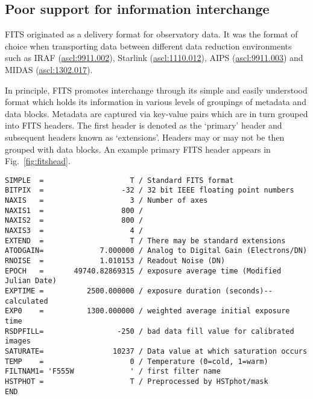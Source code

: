 \documentclass[final,authoryear,5p,times,twocolumn]{elsarticle}
\begin{document}
{{\subsection{Poor support for information interchange}
\label{section_poor_exchange}

FITS originated as a delivery format for observatory data. It was the format
of choice when transporting data between different data reduction
environments such as IRAF (\href{http://ascl.net/9911.002}{ascl:9911.002}),
Starlink (\href{http://ascl.net/1110.012}{ascl:1110.012}), AIPS
(\href{http://ascl.net/9911.003}{ascl:9911.003}) and MIDAS
(\href{http://ascl.net/1302.017}{ascl:1302.017}).


In principle, FITS promotes interchange through its simple and easily
understood format which holds its information in various levels of groupings
of metadata and data blocks. Metadata are captured via key-value pairs which
are in turn grouped into FITS headers. The first header is denoted as the
`primary' header and subsequent headers known as `extensions'. Headers may or
may not be then grouped with data blocks.  An example primary FITS header
appears in Fig.~\ref{fig:fitshead}.


\begin{figure*}
\begin{minipage}{\textwidth}
\begin{center}
\begin{verbatim}
SIMPLE  =                    T / Standard FITS format
BITPIX  =                  -32 / 32 bit IEEE floating point numbers
NAXIS   =                    3 / Number of axes
NAXIS1  =                  800 /
NAXIS2  =                  800 /
NAXIS3  =                    4 /
EXTEND  =                    T / There may be standard extensions
ATODGAIN=             7.000000 / Analog to Digital Gain (Electrons/DN)
RNOISE  =             1.010153 / Readout Noise (DN)
EPOCH   =       49740.82869315 / exposure average time (Modified Julian Date)
EXPTIME =          2500.000000 / exposure duration (seconds)--calculated
EXP0    =          1300.000000 / weighted average initial exposure time
RSDPFILL=                 -250 / bad data fill value for calibrated images
SATURATE=                10237 / Data value at which saturation occurs
TEMP    =                    0 / Temperature (0=cold, 1=warm)
FILTNAM1= 'F555W             ' / first filter name
HSTPHOT =                    T / Preprocessed by HSTphot/mask
END
\end{verbatim}
\end{center}
\caption{Representative simple primary header of a FITS file showing an assortment of FITS keywords and their associated values. Bytes which contain data may or may not follow the `END' keyword of the header.}
\label{fig:fitshead}
\end{minipage}
\end{figure*}


}}
\end{document}
